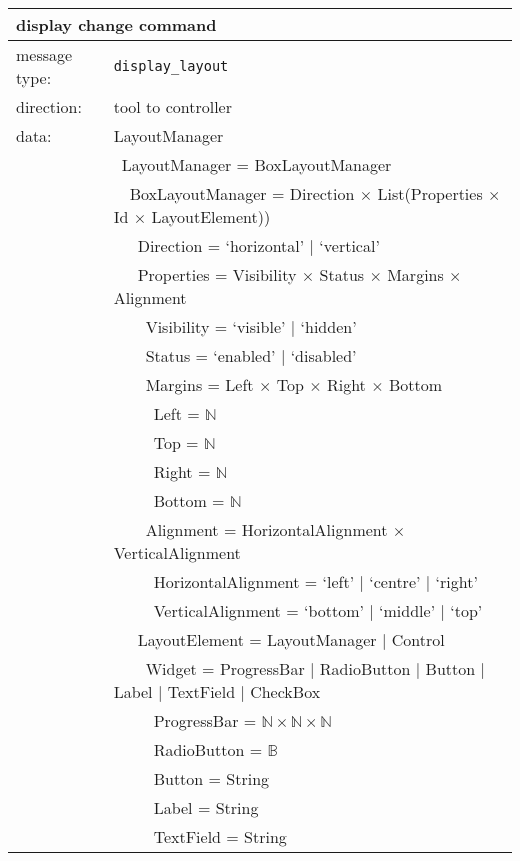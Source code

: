 \documentclass{article}
\newcommand{\msg}[1]{\texttt{#1}}
\begin{document}
   \begin{table}[H]
    \begin{center}
     \begin{tabular}{|ll|}
      \hline
       \multicolumn{2}{|l|}{\textbf{display change command}} \\
      \hline
       message type:   & \msg{display\_layout} \\
      \hline
       direction:      & tool to controller \\
       data:           & LayoutManager \\
                       & \ LayoutManager = BoxLayoutManager \\
                       & \ \ BoxLayoutManager = Direction $\times$ List(Properties $\times$ Id $\times$ LayoutElement)) \\
                       & \ \ \ Direction = `horizontal' $|$ `vertical' \\
                       & \ \ \ Properties = Visibility $\times$ Status $\times$ Margins $\times$ Alignment \\
                       & \ \ \ \ Visibility = `visible' $|$ `hidden' \\
                       & \ \ \ \ Status = `enabled' $|$ `disabled' \\
                       & \ \ \ \ Margins = Left $\times$ Top $\times$ Right $\times$ Bottom \\
                       & \ \ \ \ \ Left   = $\mathbb{N}$ \\
                       & \ \ \ \ \ Top    = $\mathbb{N}$ \\
                       & \ \ \ \ \ Right  = $\mathbb{N}$ \\
                       & \ \ \ \ \ Bottom = $\mathbb{N}$ \\
                       & \ \ \ \ Alignment = HorizontalAlignment $\times$ VerticalAlignment \\
                       & \ \ \ \ \ HorizontalAlignment = `left' $|$ `centre' $|$ `right' \\
                       & \ \ \ \ \ VerticalAlignment = `bottom' $|$ `middle' $|$ `top' \\
                       & \ \ \ LayoutElement = LayoutManager $|$ Control \\
                       & \ \ \ \ Widget = ProgressBar $|$ RadioButton $|$ Button $|$ Label $|$ TextField $|$ CheckBox \\
                       & \ \ \ \ \ ProgressBar = $\mathbb{N} \times \mathbb{N} \times \mathbb{N}$ \\
                       & \ \ \ \ \ RadioButton = $\mathbb{B}$ \\
                       & \ \ \ \ \ Button      = String \\
                       & \ \ \ \ \ Label       = String \\
                       & \ \ \ \ \ TextField   = String \\
      \hline
     \end{tabular}
    \end{center}
   \end{table}
\end{document}

